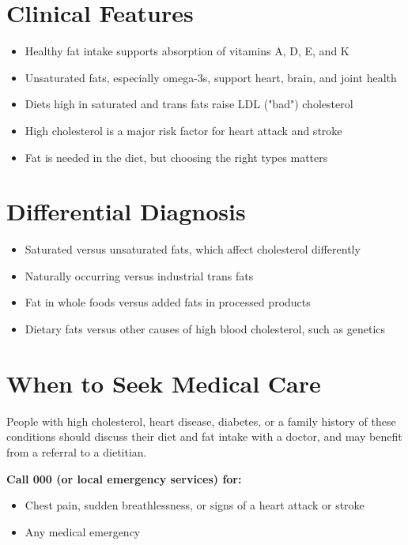 \section*{Clinical Features}
\begin{itemize}
    \item Healthy fat intake supports absorption of vitamins A, D, E, and K
    \item Unsaturated fats, especially omega-3s, support heart, brain, and joint health
    \item Diets high in saturated and trans fats raise LDL ("bad") cholesterol
    \item High cholesterol is a major risk factor for heart attack and stroke
    \item Fat is needed in the diet, but choosing the right types matters
\end{itemize}

\section*{Differential Diagnosis}
\begin{itemize}
    \item Saturated versus unsaturated fats, which affect cholesterol differently
    \item Naturally occurring versus industrial trans fats
    \item Fat in whole foods versus added fats in processed products
    \item Dietary fats versus other causes of high blood cholesterol, such as genetics
\end{itemize}

\section*{When to Seek Medical Care}
People with high cholesterol, heart disease, diabetes, or a family history of these conditions should discuss their diet and fat intake with a doctor, and may benefit from a referral to a dietitian.

\textbf{Call 000 (or local emergency services) for:}
\begin{itemize}
    \item Chest pain, sudden breathlessness, or signs of a heart attack or stroke
    \item Any medical emergency
\end{itemize}

